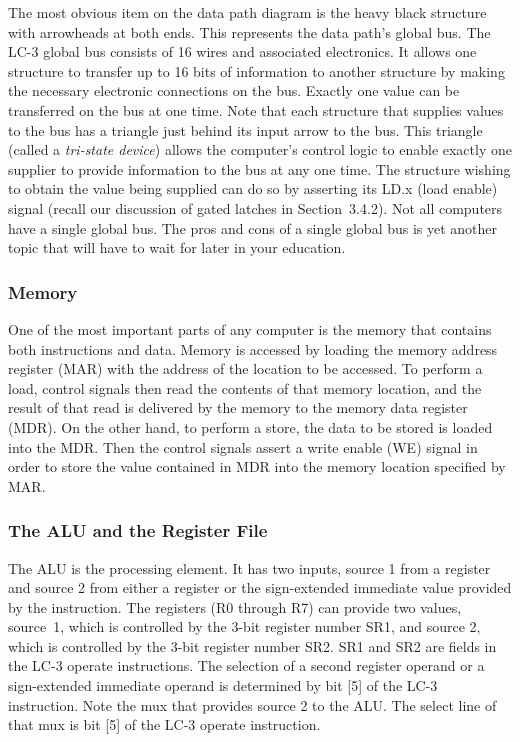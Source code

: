 \documentclass{patt}
\begin{document}
The most obvious item on the data path diagram is the heavy black structure 
with arrowheads at both ends.  This represents the data path's global bus.  
The LC-3 global bus consists of 16 wires and associated electronics.  
It allows one structure to transfer up to 16 bits of information to another
structure by making the necessary electronic connections on the bus.
Exactly one value can be transferred on the bus at one time.  Note
that each structure that supplies values to the bus has a triangle
just behind its input arrow to the bus.  This triangle (called 
a {\em tri-state device}) allows the computer's control logic to enable
exactly one supplier to provide information to the bus at any one
time.  The structure wishing to obtain the value being supplied can do
so by asserting its LD.x (load enable) signal (recall our discussion
of gated latches in Section~3.4.2).  Not all computers have a single
global bus.  The pros and cons of a single global bus is yet another
topic that will have to wait for later in your education.

\subsubsection{Memory}

One of the most important parts of any computer is the memory that
contains both instructions and data. Memory is accessed by loading the
memory address register (MAR) with the address of the location to be
accessed.  To perform a load, control signals then read the
contents of that memory location, and the result of that read is delivered 
by the memory to the
memory data register (MDR).  On the other hand, to perform a store, the data 
to be stored is loaded into the MDR.  Then the control signals assert a write
enable (WE) signal in order to store the value contained 
in MDR into the memory location specified by MAR.

\subsubsection{The ALU and the Register File}

The ALU is the processing element.  It has two inputs, source 1 from a
register and source 2 from either a register or the sign-extended
immediate value provided by the instruction.  The registers (R0
through R7) can provide two values, source~1, which is controlled by
the 3-bit register number SR1, and source 2, which is controlled by
the 3-bit register number SR2.  SR1 and SR2 are fields in the LC-3
operate instructions.  The selection of a second register operand or a
sign-extended immediate operand is determined by bit [5] of the LC-3
instruction.  Note the mux that provides source 2 to the ALU.  The
select line of that mux is bit [5] of the LC-3 operate instruction.
\end{document}

